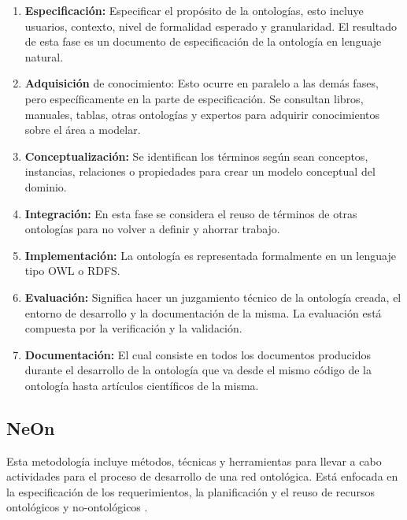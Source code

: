 \begin{enumerate}
\item \textbf{Especificación:} Especificar el propósito de la ontologías, esto incluye usuarios, contexto, nivel de formalidad esperado y granularidad. El resultado de esta fase es un documento de especificación de la ontología en lenguaje natural.
\item \textbf{Adquisición} de conocimiento: Esto ocurre en paralelo a las demás fases, pero específicamente en la parte de especificación. Se consultan libros, manuales, tablas, otras ontologías y expertos para adquirir conocimientos sobre el área a modelar.
\item \textbf{Conceptualización:} Se identifican los términos según sean conceptos, instancias, relaciones o propiedades para crear un modelo conceptual del dominio.
\item \textbf{Integración:} En esta fase se considera el reuso de términos de otras ontologías para no volver a definir y ahorrar trabajo.
\item \textbf{Implementación:} La ontología es representada formalmente en un lenguaje tipo OWL o RDFS.
\item \textbf{Evaluación:} Significa hacer un juzgamiento técnico de la ontología creada, el entorno de desarrollo y la documentación de la misma. La evaluación está compuesta por la verificación y la validación.
\item \textbf{Documentación:} El cual consiste en todos los documentos producidos durante el desarrollo de la ontología que va desde el mismo código de la ontología hasta artículos científicos de la misma.
\end{enumerate}


\subsection{NeOn}
\label{subsection:neon}
Esta metodología incluye métodos, técnicas y herramientas para llevar a cabo actividades para el proceso de desarrollo de una red ontológica. Está enfocada en la especificación de los requerimientos, la planificación y el reuso de recursos ontológicos y no-ontológicos \cite{suarez2010neon}.

